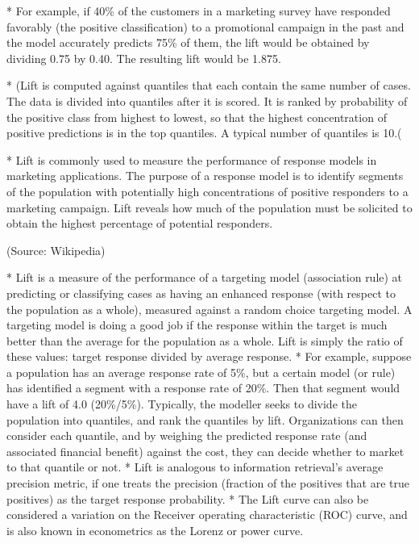 *  For example, if 40\% of the customers in a marketing survey have responded favorably (the positive classification) to a promotional campaign in the past and the model accurately predicts 75\% of them, the lift would be obtained by dividing 0.75 by 0.40. The resulting lift would be 1.875.

*  (Lift is computed against quantiles that each contain the same number of cases. The data is divided into quantiles after it is scored. It is ranked by probability of the positive class from highest to lowest, so that the highest concentration of positive predictions is in the top quantiles. A typical number of quantiles is 10.(

*  Lift is commonly used to measure the performance of response models in marketing applications. The purpose of a response model is to identify segments of the population with potentially high concentrations of positive responders to a marketing campaign. Lift reveals how much of the population must be solicited to obtain the highest percentage of potential responders.


(Source: Wikipedia)


*  Lift is a measure of the performance of a targeting model (association rule) at predicting or classifying cases as having an enhanced response (with respect to the population as a whole), measured against a random choice targeting model. A targeting model is doing a good job if the response within the target is much better than the average for the population as a whole. Lift is simply the ratio of these values: target response divided by average response.
*  For example, suppose a population has an average response rate of 5\%, but a certain model (or rule) has identified a segment with a response rate of 20\%. Then that segment would have a lift of 4.0 (20\%/5\%).
Typically, the modeller seeks to divide the population into quantiles, and rank the quantiles by lift. Organizations can then consider each quantile, and by weighing the predicted response rate (and associated financial benefit) against the cost, they can decide whether to market to that quantile or not.
*  Lift is analogous to information retrieval's average precision metric, if one treats the precision (fraction of the positives that are true positives) as the target response probability.
*  The Lift curve can also be considered a variation on the Receiver operating characteristic (ROC) curve, and is also known in econometrics as the Lorenz or power curve.

